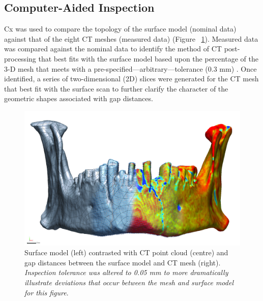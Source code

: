 \documentclass[review]{elsarticle}
\begin{document}
\subsection*{Computer-Aided Inspection}

Cx was used to compare the topology of the surface model (nominal data) against that of the eight CT meshes (measured data) \citep{RN11473} (Figure ~\ref{fig:Fig1x}). Measured data was compared against the nominal data \citep{RN11463,RN5923,RN11460,RN11465} to identify the method of CT post-processing that best fits with the surface model based upon the percentage of the 3-D mesh that meets with a pre-specified---arbitrary---tolerance (0.3 mm) \citep{RN5925,RN11471,RN11455}. Once identified, a series of two-dimensional (2D) slices were generated for the CT mesh that best fit with the surface scan to further clarify the character of the geometric shapes associated with gap distances.

\begin{figure}[ht]\centering
\includegraphics[width=\linewidth]{Fig2}
\caption{Surface model (left) contrasted with CT point cloud (centre) and gap distances between the surface model and CT mesh (right). \textit{Inspection tolerance was altered to 0.05 mm to more dramatically illustrate deviations that occur between the mesh and surface model for this figure}.}
\label{fig:Fig1x}
\end{figure}
\end{document}
